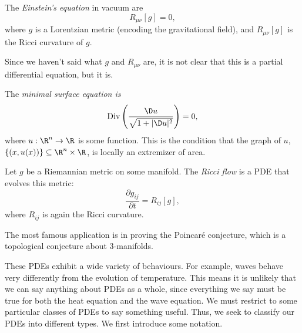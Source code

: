 \documentclass[a4paper]{article}
\begin{document}
\begin{eg}
  The \emph{Einstein's equation} in vacuum are
  \[
    R_{\mu\nu}[g] = 0,
  \]
  where $g$ is a Lorentzian metric (encoding the gravitational field), and $R_{\mu\nu}[g]$ is the Ricci curvature of $g$.

  Since we haven't said what $g$ and $R_{\mu\nu}$ are, it is not clear that this is a partial differential equation, but it is.
\end{eg}

\begin{eg}
  The \emph{minimal surface equation is}
  \[
    \mathrm{Div}\left(\frac{\D u}{\sqrt{1 + |\D u|^2}}\right) = 0,
  \]
  where $u: \R^n \to \R$ is some function. This is the condition that the graph of $u$, $\{(x, u(x))\}\subseteq \R^n \times \R$, is locally an extremizer of area.
\end{eg}

\begin{eg}
  Let $g$ be a Riemannian metric on some manifold. The \emph{Ricci flow} is a PDE that evolves this metric:
  \[
    \frac{\partial g_{ij}}{\partial t} = R_{ij}[g],
  \]
  where $R_{ij}$ is again the Ricci curvature.

  The most famous application is in proving the Poincar\'e conjecture, which is a topological conjecture about $3$-manifolds.
\end{eg}

These PDEs exhibit a wide variety of behaviours. For example, waves behave very differently from the evolution of temperature. This means it is unlikely that we can say anything about PDEs as a whole, since everything we say must be true for both the heat equation and the wave equation. We must restrict to some particular classes of PDEs to say something useful. Thus, we seek to classify our PDEs into different types. We first introduce some notation.
\end{document}
